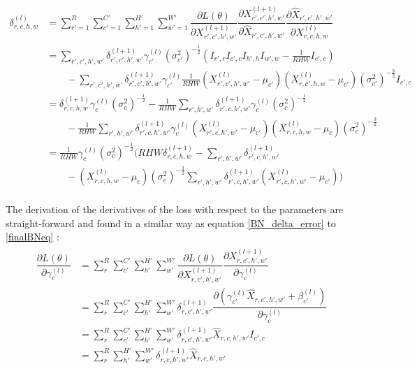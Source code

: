 \documentclass[a4paper, twoside]{article}
\newcommand*{\pd}[2]{\ensuremath{\dfrac{\partial #1}{\partial #2}}}
\begin{document}
\begin{equation}\label{finalBNeq}
\begin{split}
	\delta^{(l)}_{r,c,h,w} 
	& = \sum^{R }_{r'=1} \sum^{C' }_{c'=1} \sum^{H' }_{h'=1} \sum^{W' }_{w'=1} \pd{L(\theta)}{X^{(l+1)}_{r',c',h',w'}} \pd{X^{(l+1)}_{r',c',h',w'}}{\hat{X}_{r',c',h',w'}} \pd{\hat{X}_{r',c',h',w'}}{{X}^{(l)}_{r,c,h,w}}\\
	& = \sum\limits_{r',c',h',w'}\delta^{(l+1)}_{r',c',h',w'} \gamma^{(l)}_{c'} {(\sigma^2_{c'})}^{-\frac{1}{2}} (I_{r',r} I_{c',c} I_{h',h} I_{w',w} - \frac{1}{RHW} I_{c',c}) \\
	& \qquad -\sum\limits_{r',c',h',w'}\delta^{(l+1)}_{r',c',h',w'} \gamma^{(l)}_{c'} \frac{1}{RHW} ({X^{(l)}_{r',c',h',w'} - \mu_{c'}})({X^{(l)}_{r,c',h,w} - \mu_{c'}}) {(\sigma^2_{c'})}^{-\frac{3}{2}} I_{c',c} \\
	& = \delta^{(l+1)}_{r,c,h,w} \gamma^{(l)}_{c} {(\sigma^2_{c})}^{-\frac{1}{2}} - \frac{1}{RHW} \sum\limits_{r',h',w'} \delta^{(l+1)}_{r',c,h',w'} \gamma^{(l)}_{c} {(\sigma^2_{c})}^{-\frac{1}{2}}\\
	& \qquad - \frac{1}{RHW} \sum\limits_{r',h',w'} \delta^{(l+1)}_{r',c,h',w'}\gamma^{(l)}_{c} ({X^{(l)}_{r',c,h',w'} - \mu_{c'}})({X^{(l)}_{r,c,h,w} - \mu_{c}}){(\sigma^2_{c})}^{-\frac{3}{2}} \\
	& = \frac{1}{RHW} \gamma^{(l)}_c {(\sigma^2_{c})}^{-\frac{1}{2}} \biggl(    RHW \delta^{(l+1)}_{r,c,h,w} -  \sum\limits_{r',h',w'} \delta^{(l+1)}_{r',c,h',w'} \qquad \\
	& \qquad -  ({X^{(l)}_{r,c,h,w} - \mu_{c}}) {(\sigma^2_{c})}^{-\frac{3}{2}} \sum\limits_{r',h',w'} \delta^{(l+1)}_{r',c,h',w'} ({X^{(l)}_{r',c,h',w'} - \mu_{c'}}) \biggl) \\
\end{split}
\end{equation}

The derivation of the derivatives of the loss with respect to the parameters are straight-forward and found in a similar way as equation \eqref{BN_delta_error} to \eqref{finalBNeq} \cite{webBN1} \cite{webBN2}:
\begin{align}
\begin{split}
	\pd{L(\theta)}{\gamma^{(l)}_{c}}
		& = \sum^{R }_{r} \sum^{C' }_{c'} \sum^{H' }_{h'} \sum^{W' }_{w'} \pd{L(\theta)}{X^{(l+1)}_{r,c',h',w'}} \pd{X^{(l+1)}_{r,c',h',w'}}{\gamma^{(l)}_{c}} \\
		& = \sum^{R }_{r} \sum^{C' }_{c'} \sum^{H' }_{h'} \sum^{W' }_{w'} \delta^{(l+1)}_{r,c',h',w'}  \pd{({\gamma_{c'}^{(l)} \hat{X}_{r,c',h',w'} + \beta_{c'}^{(l)}})}{\gamma^{(l)}_{c}} \\
		& = \sum^{R }_{r} \sum^{C' }_{c'} \sum^{H' }_{h'} \sum^{W' }_{w'} \delta^{(l+1)}_{r,c',h',w'} \hat{X}_{r,c,h',w'} I_{c',c}\\
		& = \sum^{R }_{r} \sum^{H' }_{h'} \sum^{W' }_{w'} \delta^{(l+1)}_{r,c,h',w'} \hat{X}_{r,c,h',w'} \\
\end{split}
\end{align}
\end{document}
